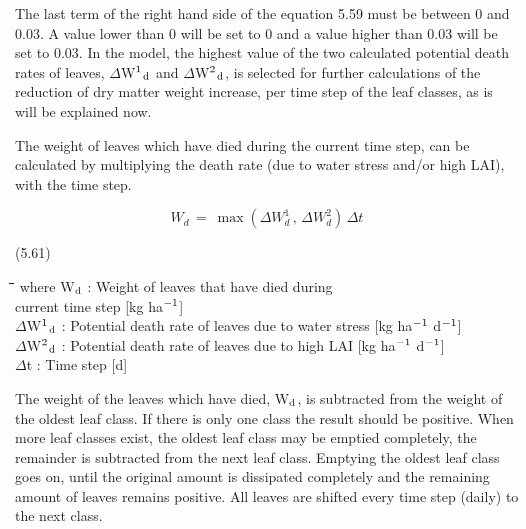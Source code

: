 The last term of the right hand side of the equation 5.59 must be between 0 and 0.03. A 
value lower than 0 will be set to 0 and a value higher than 0.03 will be set to 0.03. In the
model, the highest value of the two calculated potential death rates of leaves, $\Delta$W$^{{\rm 1}}$$_{{\rm d}}$ and
$\Delta$W$^{{\rm 2}}$$_{{\rm d}}$, is selected for further calculations of the reduction of dry matter weight increase,
per time step of the leaf classes, as is will be explained now. 



The weight of leaves which have died during the current time step, can be calculated by
multiplying the death rate (due to water stress and/or high LAI), with the time step.

\begin{displaymath}
W _{d~} =~ \max (\Delta W _{d}^{1} \, ,\,\Delta W _{d}^{2} )\,\Delta t
\end{displaymath}

 
\strut\hfill (5.61)
\nwln
\begin{tabbing}
\hspace{1.27cm}\=\hspace{1.27cm}\=\hspace{1.27cm}\=\hspace{1.27cm}\=%
\hspace{1.27cm}\=\hspace{1.27cm}\=\hspace{1.27cm}\=\hspace{1.27cm}\=%
\hspace{1.27cm}\=\hspace{1.27cm}\=\kill
where W$_{{\rm d}}$ : Weight of leaves that have died during \\
   current time step        [kg ha$^{{\rm -1}}$]\\
$\Delta$W$^{{\rm 1}}$$_{{\rm d}}$ : Potential death rate of leaves due to water stress         [kg ha$^{{\rm -1}}$ d$^{{\rm -1}}$]\\
$\Delta$W$^{{\rm 2}}$$_{{\rm d}}$ : Potential death rate of leaves due to high LAI        [kg ha$^{{\rm -1}}$ d$^{{\rm -1}}$]\\
$\Delta$t : Time step        [d]
\end{tabbing}

 
The weight of the leaves which have died, W$_{{\rm d}}$, is subtracted from the weight of the oldest
leaf class. If there is only one class the result should be positive. When more leaf classes
exist, the oldest leaf class may be emptied completely, the remainder is subtracted from
the next leaf class. Emptying the oldest leaf class goes on, until the original amount is
dissipated complete\-ly and the remaining amount of leaves remains positive. All leaves are
shifted every time step (daily) to the next class.


